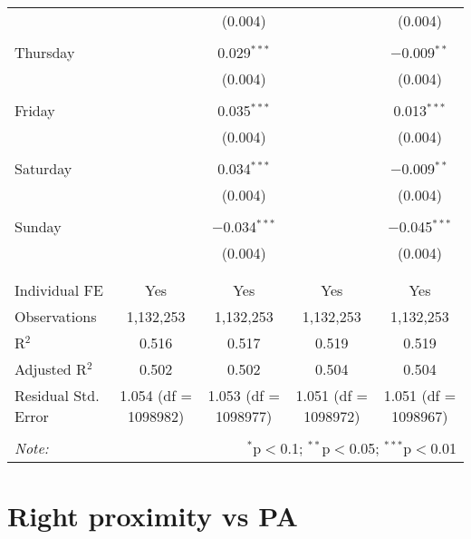 \documentclass[
]{article}
\begin{document}
\begin{table}[!htbp]
{\begin{tabular}{@{\extracolsep{5pt}}lcccc}
  &  & (0.004) &  & (0.004) \\ 
  & & & & \\ 
 Thursday &  & 0.029$^{***}$ &  & $-$0.009$^{**}$ \\ 
  &  & (0.004) &  & (0.004) \\ 
  & & & & \\ 
 Friday &  & 0.035$^{***}$ &  & 0.013$^{***}$ \\ 
  &  & (0.004) &  & (0.004) \\ 
  & & & & \\ 
 Saturday &  & 0.034$^{***}$ &  & $-$0.009$^{**}$ \\ 
  &  & (0.004) &  & (0.004) \\ 
  & & & & \\ 
 Sunday &  & $-$0.034$^{***}$ &  & $-$0.045$^{***}$ \\ 
  &  & (0.004) &  & (0.004) \\ 
  & & & & \\ 
\hline \\[-1.8ex] 
Individual FE & Yes & Yes & Yes & Yes \\ 
Observations & 1,132,253 & 1,132,253 & 1,132,253 & 1,132,253 \\ 
R$^{2}$ & 0.516 & 0.517 & 0.519 & 0.519 \\ 
Adjusted R$^{2}$ & 0.502 & 0.502 & 0.504 & 0.504 \\ 
Residual Std. Error & 1.054 (df = 1098982) & 1.053 (df = 1098977) & 1.051 (df = 1098972) & 1.051 (df = 1098967) \\ 
\hline 
\hline \\[-1.8ex] 
\textit{Note:}  & \multicolumn{4}{r}{$^{*}$p$<$0.1; $^{**}$p$<$0.05; $^{***}$p$<$0.01} \\ 
\end{tabular}
} 
\end{table} 
\newpage
\section{Right proximity vs PA}
\end{document}
